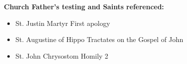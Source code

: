 \documentclass[a5paper,pagesize,10pt,bibtotoc,pointlessnumbers,
normalheadings,DIV=9,twoside=false]{scrbook}
\begin{document}
\textbf{Church Father's testing and Saints referenced:}
\begin{itemize}
    \item St. Justin Martyr
    \subitem First apology
    \item St. Augustine of Hippo
    \subitem Tractates on the Gospel of John
    \item St. John Chrysostom
    \subitem Homily 2
\end{itemize}
\newpage
{}

\end{document}
